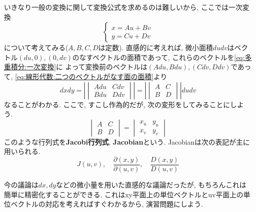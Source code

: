 \documentclass[a4j,dvipdfmx]{jsarticle}
\numberwithin{equation}{section}
\begin{document}
            いきなり一般の変換に関して変換公式を求めるのは難しいから, ここでは一次変換
            \begin{equation}
                \left\{\begin{array}{c}
                    x=Au+Bv\\
                    y=Cu+Dv
                \end{array}\right. \label{eq:多重積分:一次変換}
            \end{equation}
            について考えてみる($A,B,C,D$は定数). 直感的に考えれば, 微小面積$dudv$はベクトル$(du,0),(0,dv)$のなすベクトルの面積であって, これらのベクトルを\eqref{eq:多重積分:一次変換}に
            よって変換前のベクトルは$(Adu,Bdu),(Cdv,Ddv)$であって, \eqref{eq:線形代数:二つのベクトルがなす面の面積}より
            \begin{equation*}
                dxdy=\left|\begin{vmatrix}Adu & Cdv \\ Bdu & Ddv\end{vmatrix}\right|=\left|\begin{vmatrix}A & C \\ B & D\end{vmatrix}\right|dudv
            \end{equation*}
            なることがわかる. ここで, すこし作為的だが, 次の変形をしてみることにしよう.
            \begin{equation*}
                \begin{vmatrix}A & C \\ B & D\end{vmatrix}=\begin{vmatrix}x_u & y_u \\ x_v & y_v\end{vmatrix}
            \end{equation*}
            このような行列式を\textbf{Jacobi行列式}, \textbf{Jacobian}という. Jacobianは次の表記が主に用いられる.
            \begin{equation}
                J(u,v),\quad \frac{\partial(x,y)}{\partial(u,v)},\quad \frac{D(x,y)}{D(u,v)}
            \end{equation}

            今の議論は$dx,dy$などの微小量を用いた直感的な議論だったが, もちろんこれは簡単に精密化することができる. これはxy平面上の単位ベクトルとuv平面上の単位ベクトルの対応を考えればすぐわかるから, 
            演習問題にしよう.
            
\end{document}
